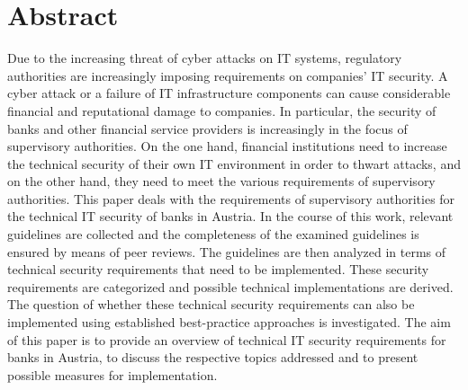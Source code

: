 \chapter{Abstract}
Due to the increasing threat of cyber attacks on IT systems, regulatory authorities are increasingly imposing requirements on companies' IT security. A cyber attack or a failure of IT infrastructure components can cause considerable financial and reputational damage to companies. In particular, the security of banks and other financial service providers is increasingly in the focus of supervisory authorities. On the one hand, financial institutions need to increase the technical security of their own IT environment in order to thwart attacks, and on the other hand, they need to meet the various requirements of supervisory authorities. This paper deals with the requirements of supervisory authorities for the technical IT security of banks in Austria. In the course of this work, relevant guidelines are collected and the completeness of the examined guidelines is ensured by means of peer reviews. The guidelines are then analyzed in terms of technical security requirements that need to be implemented. These security requirements are categorized and possible technical implementations are derived. The question of whether these technical security requirements can also be implemented using established best-practice approaches is investigated. The aim of this paper is to provide an overview of technical IT security requirements for banks in Austria, to discuss the respective topics addressed and to present possible measures for implementation.